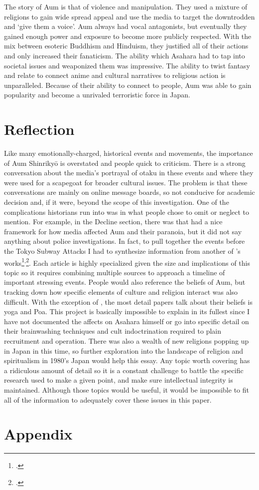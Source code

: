 \documentclass[12pt, letterpaper]{article}
\newcommand{\sorta}[1]{`#1'}
\newcommand{\poses}[1]{#1's}
\begin{document}
The story of Aum is that of violence and manipulation. They used a mixture of religions to gain wide spread
appeal and use the media to target the downtrodden and \sorta{give them a voice}. Aum always had vocal
antagonists, but eventually they gained enough power and exposure to become more publicly respected. With the
mix between esoteric Buddhism and Hinduism, they justified all of their actions and only increased their
fanaticism. The ability which Asahara had to tap into societal issues and weaponized them was impressive. The
ability to twist fantasy and relate to connect anime and cultural narratives to religious action is
unparalleled. Because of their ability to connect to people, Aum was able to gain popularity and become a
unrivaled terroristic force in Japan.

\section{Reflection}
Like many emotionally-charged, historical events and movements, the importance of Aum Shinriky\=o is overstated and
people quick to criticism. There is a strong conversation about the media's portrayal of otaku in these 
events and where they were used for a scapegoat for broader cultural issues. The problem is that these
conversations are mainly on online message boards, so not conducive for academic decision and, if it were,
beyond the scope of this investigation. One of the complications historians run into was in what people chose to omit
or neglect to mention. For example, in the Decline section, there was  
that had a nice framework for how media affected Aum and their paranoia, but it did not say anything about
police investigations. In fact, to pull together the events before the Tokyo Subway Attacks I had to
synthesize information from another of \poses{\citeauthor{watanabe_reactions_1997}}
works\footcite{watanabe_reactions_1997}\textsuperscript{,}\footcite{watanabe_religion_1998}. Each article is
highly specialized given the size and implications of this topic so it requires combining multiple sources to
approach a timeline of important stressing events. People would also reference the beliefs of Aum, but
tracking down how specific elements of culture and religion interact was also difficult. With the exception
of , the most detail papers talk about their beliefs is yoga and Poa. This
project is basically impossible to explain in its fullest since I have not documented the affects on Asahara
himself or go into specific detail on their brainwashing techniques and cult indoctrination required to plain
recruitment and operation. There was also a wealth of new religions popping up in Japan in this time, so
further exploration into the landscape of religion and spiritualism in \poses{1980} Japan would help this
essay. Any topic worth covering has a ridiculous amount of detail so it is a constant
challenge to battle the specific research used to make a given point, and make sure intellectual integrity is
maintained. Although those topics would be useful, it would be impossible to fit all of the information to
adequately cover these issues in this paper.
\newpage
\printbibliography{}
\newpage
\section*{Appendix}
\listoffigures{}
\end{document}
